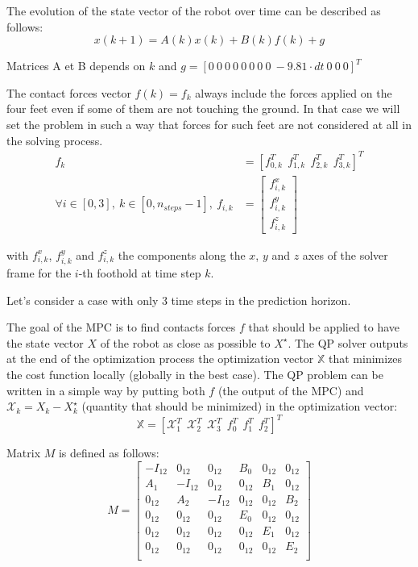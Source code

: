 \documentclass[a4paper,11pt]{article}
\begin{document}
The evolution of the state vector of the robot over time can be described as follows:
\begin{equation}
x(k+1) = A(k) x(k) + B(k) f(k) + g
\end{equation}

Matrices A et B depends on $k$ and $g = [0 ~ 0 ~ 0 ~ 0 ~ 0 ~ 0 ~ 0 ~ 0 ~ -9.81 \cdot dt~ 0 ~ 0 ~ 0]^T$

The contact forces vector $f(k) = f_k$ always include the forces applied on the four feet even if some of them are not touching the ground. In that case we will set the problem in such a way that forces for such feet are not considered at all in the solving process.
\begin{align}
f_k &= [f_{0,k}^T ~~ f_{1,k}^T ~~ f_{2,k}^T ~~ f_{3,k}^T]^T \\
\forall i \in [0, 3],~k\in[0, n_{steps}-1], ~f_{i, k} &= \begin{bmatrix} f^x_{i,k} \\ f^y_{i,k} \\ f^z_{i,k} \end{bmatrix}
\end{align}

with $f^x_{i,k}$, $f^y_{i,k}$ and $f^z_{i,k}$ the components along the $x$, $y$ and $z$ axes of the solver frame for the $i$-th foothold at time step $k$.

Let's consider a case with only 3 time steps in the prediction horizon.

The goal of the MPC is to find contacts forces $f$ that should be applied to have the state vector $X$ of the robot as close as possible to $X^\star$. The QP solver outputs at the end of the optimization process the optimization vector $\mathbb{X}$ that minimizes the cost function locally (globally in the best case). The QP problem can be written in a simple way by putting both $f$ (the output of the MPC) and $\mathcal{X}_k = X_k - X_k^\star$ (quantity that should be minimized) in the optimization vector:
\begin{equation}
\mathbb{X} = [\mathcal{X}_1^T ~~ \mathcal{X}_2^T ~~ \mathcal{X}_3^T ~~ f_0^T ~~ f_1^T ~~ f_2^T ]^T
\end{equation}


Matrix $M$ is defined as follows:
\begin{equation}
M = \begin{bmatrix} 
-I_{12} & 0_{12} & 0_{12}  & B_0 & 0_{12} & 0_{12}  \\
A_1 & -I_{12} & 0_{12}  & 0_{12} & B_1 & 0_{12} \\
0_{12} & A_2 & -I_{12}  & 0_{12} & 0_{12} & B_2 \\
0_{12} & 0_{12} & 0_{12}  & E_0 & 0_{12} & 0_{12} \\
0_{12} & 0_{12} & 0_{12}  & 0_{12} & E_1 & 0_{12} \\
0_{12} & 0_{12} & 0_{12}  & 0_{12} & 0_{12} & E_2 \\ \end{bmatrix}
\end{equation}
\end{document}
